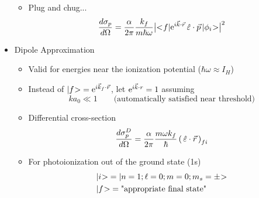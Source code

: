 \documentclass[12pt,letterpaper]{article}
\newcommand{\prfi}{\ltp \hat\eng \cdot \vec r \rtp_{fi}}
\begin{document}
\begin{Aenumerate}
\begin{itemize}
\begin{itemize}
	\item Plug and chug...
	\begin{equation}
	\frac{d\sigma_p}{d\Omega} = \frac{\alpha}{2\pi} 
	     \frac{k_f}{m\hbar\omega} 
	\big | {<\negmedspace f|} {\rm e}^{i \vec k \cdot \vec r} \, \hat{\varepsilon} \cdot \vec p \,
	  {|\phi_i\negmedspace>} \big|^2
	\end{equation}
	\end{itemize}

 \item Dipole Approximation
 	\begin{itemize}
	\item Valid for energies near the ionization potential 
	($\hbar \omega \approx I_H$)
	\item Instead of ${|f\negmedspace>} = {\rm e}^{i \vec k_f \cdot \vec r}$, let
	${\rm e}^{i \vec k \cdot r} = 1$ assuming
	\begin{equation*}
	k a_0 \ll 1 \quad\quad \text{(automatically satisfied near threshold)}
	\end{equation*}
	\item Differential cross-section
	\begin{equation}
	\frac{d\sigma^D_p}{d\Omega} = \frac{\alpha}{2\pi} 
	   \frac{m\omega k_f}{\hbar}  \prfi
	\end{equation}
	\item For photoionization out of the ground state (1s)
	\begin{align}
	&{|i\negmedspace>} = {|n=1; \ell=0; m=0; m_s=\pm\negmedspace>} \\
	&{|f\negmedspace>} = \text{"appropriate final state"}
	\end{align}
	\end{itemize}


\end{itemize}
\end{Aenumerate}
\end{document}
